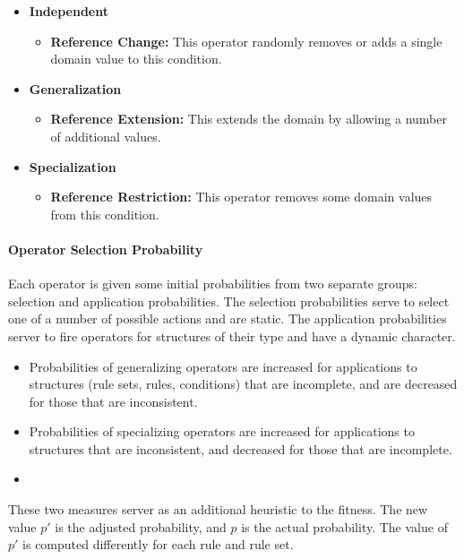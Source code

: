 \documentclass[../main.tex]{subfiles}
\begin{document}
\begin{itemize}
	\item \textbf{Independent}
	\begin{itemize}
		\item \textbf{Reference Change:} This operator randomly removes or adds a single domain value to this
		condition.
	\end{itemize}
	\item \textbf{Generalization}
		\begin{itemize}
		\item \textbf{Reference Extension:} This extends the domain by allowing a number of additional values.
	\end{itemize}
	\item \textbf{Specialization}
	\begin{itemize}
		\item \textbf{Reference Restriction:} This operator removes some domain values from this condition.
	\end{itemize}
\end{itemize}

\paragraph{Operator Selection Probability}
Each operator is given some initial probabilities from two separate groups: selection and application probabilities.
The selection probabilities serve to select one of a number of possible actions and are static. The application probabilities server to fire operators for structures of their type and have a dynamic character.

\begin{itemize}
	\item Probabilities of generalizing operators are increased for applications to structures (rule sets, rules,
	conditions) that are incomplete, and are decreased for those that are inconsistent.
	\item Probabilities of specializing operators are increased for applications to structures that are inconsistent,
	and decreased for those that are incomplete.
	\item
\end{itemize}

These two measures server as an additional heuristic to the fitness. The new value $p'$ is the adjusted probability, and $p$ is the actual probability. The value of $p'$ is computed differently for each rule and rule set.
\end{document}
